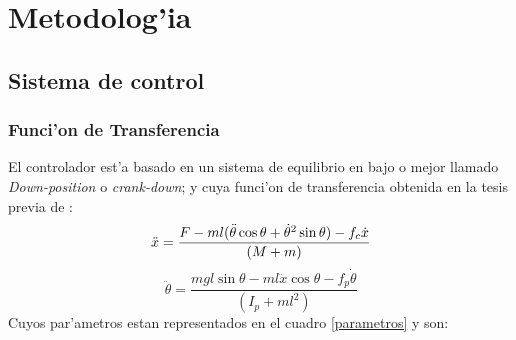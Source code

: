\chapter{Metodolog'ia}

\section{Sistema de control}

\subsection{Funci'on de Transferencia}

\abovedisplayskip=0pt
\belowdisplayskip=0pt

El controlador est'a basado en un sistema de equilibrio en bajo o mejor llamado \textit{Down-position} o \textit{crank-down}; y cuya funci'on de transferencia obtenida en la tesis previa de \citet{montalvo}:
\setlength{\parskip}{0pt}
\begin{equation}\label{eq:1} 
\,\ddot{x}=\frac{F-ml(\ddot{\theta}\cos\theta+\dot{\theta}^{2}\sin{\theta})-f_{c}\dot{x}}{(M+m)}\\
\end{equation}
\begin{equation}\label{eq:2}
\,\ddot{\theta}=\frac{mgl\sin{\theta}-ml\ddot{x}\cos{\theta}-f_{p}\dot{\theta}}{(I_{p}+ml^{2})}
\end{equation}
\setlength{\parskip}{0.4cm}
Cuyos par'ametros estan representados en el cuadro \ref{parametros} y son:
